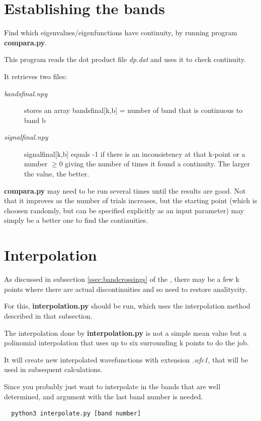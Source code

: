 \documentclass[a4paper,12pt]{report}
\begin{document}
\section{Establishing the bands}
Find which eigenvalues/eigenfunctions have continuity, by running program \textbf{compara.py}.

This program reads the dot product file \emph{dp.dat} and uses it to check continuity.

 It retrieves two files:
 \begin{description}
   \item[\emph{bandsfinal.npy}] stores an array bandsfinal[k,b] = number of band that is continuous to band b
   \item[\emph{signalfinal.npy}] signalfinal[k,b] equals -1 if there is an inconsistency at
   that k-point or a number $\ge0$
  giving the number of times it found a continuity. The larger the value, the better.
 \end{description}

 \textbf{compara.py} may need to be run several times until the results are good.
 Not that it improves as the number of trials increases, but the starting point
 (which is choosen randomly, but can be specified explicitly as an input parameter)
 may simply be a better one to find the continuities.


\section{Interpolation}
 As discussed in subsection \ref{ssec:bandcrossings} of the ,
 there may be a few k points where there are actual discontinuities and so need to restore analitycity.

 For this, \textbf{interpolation.py} should be run, which uses the interpolation method described in that subsection.

 The interpolation done by \textbf{interpolation.py} is not a simple mean value but a polinomial interpolation
 that uses up to six surrounding k points to do the job.

 It will create new interpolated wavefunctions with extension \emph{.wfc1}, that will be used in subsequent calculations.

 Since you probably just want to interpolate in the bands that are well determined, and argument with the last band number
 is needed.
 \begin{verbatim}
  python3 interpolate.py [band number]
 \end{verbatim}
\end{document}
